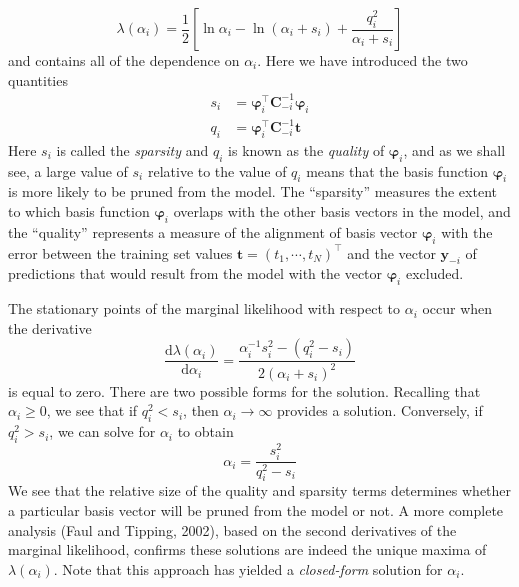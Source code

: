 \documentclass[a4paper]{report}
\newcommand{\ud}{\mathrm{d}}
\renewcommand{\bf}{\mathbf}
\newcommand{\imp}[1]{{\color{blue}\textit{#1}}}
\newcommand{\bs}{\boldsymbol}
\begin{document}
\begin{equation}
	\lambda(\alpha_i) = \frac{1}{2}  \left[\ln \alpha_i-\ln (\alpha_i+s_i)+\frac{q_i^{2}}{\alpha_i+s_i} \right]
\end{equation}
and contains all of the dependence on $\alpha_i$. Here we have introduced the two quantities
\begin{align}
	s_i &= \bs{\varphi}_i^{\intercal} \bf{C}_{-i}^{-1} \bs{\varphi}_i \\
	q_i &= \bs{\varphi}_i^{\intercal} \bf{C}_{-i}^{-1} \bf{t}
\end{align}
Here $s_i$ is called the \imp{sparsity} and $q_i$ is known as the \imp{quality} of $\bs{\varphi}_i$, and as we shall see, a large value of $s_i$ relative to the value of $q_i$ means that the basis function $\bs{\varphi}_i$ is more likely to be pruned from the model. The ``sparsity'' measures the extent to which basis function $\bs{\varphi}_i$ overlaps with the other basis vectors in the model, and the ``quality'' represents a measure of the alignment of basis vector $\bs{\varphi}_i$ with the error between the training set values $\bf{t} = (t_1,\cdots,t_N)^{\intercal}$ and the vector $\bf{y}_{-i}$ of predictions that would result from the model with the vector $\bs{\varphi}_i$ excluded.

The stationary points of the marginal likelihood with respect to $\alpha_i$ occur when the derivative
\begin{equation}
	\frac{\ud \lambda(\alpha_i)}{\ud \alpha_i} = \frac{\alpha_i^{-1}s_i^2-(q_i^2-s_i)}{2(\alpha_i+s_i)^2}
\end{equation}
is equal to zero. There are two possible forms for the solution. Recalling that $\alpha_i \geq 0$, we see that if $q_i^2 < s_i$, then $\alpha_i \rightarrow \infty $ provides a solution. Conversely, if $q_i^2 > s_i$, we can solve for $\alpha_i$ to obtain
\begin{equation}
	\alpha_i = \frac{s_i^2}{q_i^2-s_i} \label{RVMa}
\end{equation}
We see that the relative size of the quality and sparsity terms determines whether a particular basis vector will be pruned from the model or not. A more complete analysis (Faul and Tipping, 2002), based on the second derivatives of the marginal likelihood, confirms these solutions are indeed the unique maxima of $\lambda(\alpha_i)$. Note that this approach has yielded a \imp{closed-form} solution for $\alpha_i$.
\end{document}
